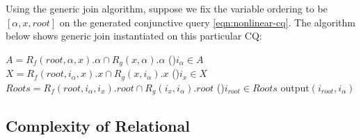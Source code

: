 Using the generic join algorithm, suppose we fix the variable ordering to be
$[\alpha, x, \textit{root}]$ on the generated conjunctive query \ref{eqn:nonlinear-cq}.
The algorithm below shows generic join instantiated on this particular CQ:

\begin{algorithm}
  \LinesNumbered{} \SetAlgoLined{}
  $A = R_f(\mathit{root},\alpha,x).\alpha \cap R_g(x,\alpha).\alpha$\;
  \For(){$i_\alpha \in A$} {
    $X = R_f(\mathit{root},i_\alpha,x).x \cap R_g(x,i_\alpha).x$\;
    \For(){$i_x \in X$} {
      $\mathit{Roots} = R_f(\mathit{root},i_\alpha,i_x).\mathit{root} \cap R_g(i_x,i_\alpha).\mathit{root}$\;
      \For(){$i_{\mathit{root}} \in \mathit{Roots}$}{
        output$(i_{\mathit{root}}, i_\alpha)$ } } }
  \caption{
    Relational \ematching using GJ for $f(\alpha, g(\alpha))$,
    with ordering $[\alpha, x, \mathit{root}]$.
  }\label{alg:gj-pattern}
\end{algorithm}

\subsection{Complexity of Relational \Ematching}

